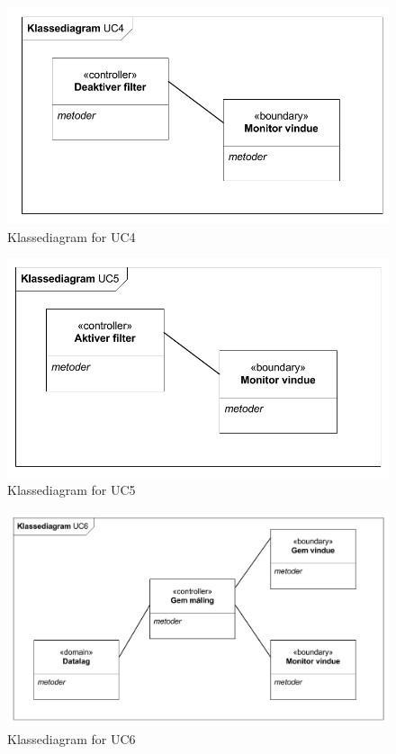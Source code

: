 \begin{figure}[H]
	\centering
	\includegraphics[width=1\textwidth]{Figurer/Snip20151102_18}
	\caption{Klassediagram for UC4}
\end{figure}

\begin{figure}[H]
	\centering
	\includegraphics[width=1\textwidth]{Figurer/Snip20151102_19}
	\caption{Klassediagram for UC5}
\end{figure}

\begin{figure}[H]
	\centering
	\includegraphics[width=1\textwidth]{Figurer/Snip20151102_20}
	\caption{Klassediagram for UC6}
\end{figure}



